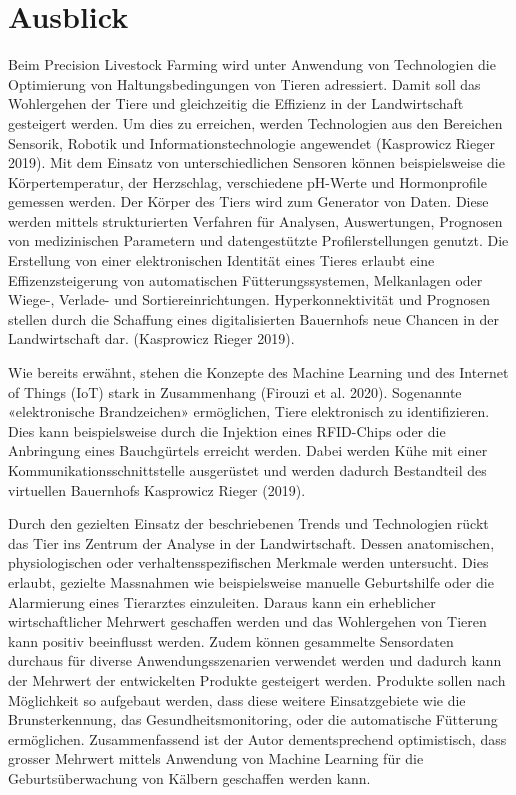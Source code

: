 

\chapter{Ausblick}

Beim Precision Livestock Farming wird unter Anwendung von Technologien die
Optimierung von Haltungsbedingungen von Tieren adressiert. Damit soll das Wohlergehen
der Tiere und gleichzeitig die Effizienz in der Landwirtschaft gesteigert
werden. Um dies zu erreichen, werden Technologien aus den Bereichen Sensorik,
Robotik und Informationstechnologie angewendet (Kasprowicz  Rieger 2019). Mit
dem Einsatz von unterschiedlichen Sensoren können beispielsweise die Körpertemperatur,
der Herzschlag, verschiedene pH-Werte und Hormonprofile gemessen
werden. Der Körper des Tiers wird zum Generator von Daten. Diese werden mittels
strukturierten Verfahren für Analysen, Auswertungen, Prognosen von medizinischen
Parametern und datengestützte Profilerstellungen genutzt. Die Erstellung
von einer elektronischen Identität eines Tieres erlaubt eine Effizenzsteigerung von
automatischen Fütterungssystemen, Melkanlagen oder Wiege-, Verlade- und Sortiereinrichtungen.
Hyperkonnektivität und Prognosen stellen durch die Schaffung eines
digitalisierten Bauernhofs neue Chancen in der Landwirtschaft dar. (Kasprowicz 
Rieger 2019).

Wie bereits erwähnt, stehen die Konzepte des Machine Learning und des Internet
of Things (IoT) stark in Zusammenhang (Firouzi et al. 2020). Sogenannte «elektronische
Brandzeichen» ermöglichen, Tiere elektronisch zu identifizieren. Dies kann
beispielsweise durch die Injektion eines RFID-Chips oder die Anbringung eines
Bauchgürtels erreicht werden. Dabei werden Kühe mit einer Kommunikationsschnittstelle
ausgerüstet und werden dadurch Bestandteil des virtuellen Bauernhofs
Kasprowicz  Rieger (2019).


Durch den gezielten Einsatz der beschriebenen Trends und Technologien rückt
das Tier ins Zentrum der Analyse in der Landwirtschaft. Dessen anatomischen,
physiologischen oder verhaltensspezifischen Merkmale werden untersucht. Dies
erlaubt, gezielte Massnahmen wie beispielsweise manuelle Geburtshilfe oder die
Alarmierung eines Tierarztes einzuleiten. Daraus kann ein erheblicher wirtschaftlicher
Mehrwert geschaffen werden und das Wohlergehen von Tieren kann positiv
beeinflusst werden.
Zudem können gesammelte Sensordaten durchaus für diverse Anwendungsszenarien
verwendet werden und dadurch kann der Mehrwert der entwickelten Produkte
gesteigert werden. Produkte sollen nach Möglichkeit so aufgebaut werden, dass
diese weitere Einsatzgebiete wie die Brunsterkennung, das Gesundheitsmonitoring,
oder die automatische Fütterung ermöglichen.
Zusammenfassend ist der Autor dementsprechend optimistisch, dass grosser Mehrwert
mittels Anwendung von Machine Learning für die Geburtsüberwachung von
Kälbern geschaffen werden kann.

